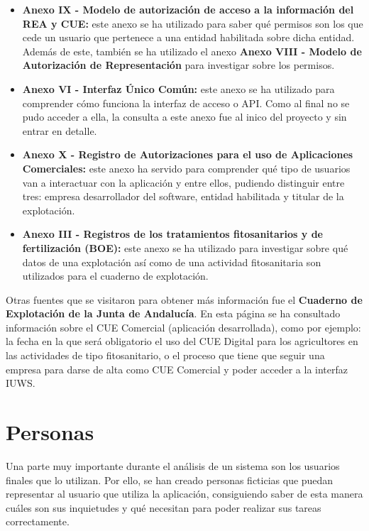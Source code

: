 \begin{itemize}
    \item \textbf{Anexo IX - Modelo de autorización de acceso a la información del REA y CUE:} este anexo se ha utilizado para saber qué permisos son
    los que cede un usuario que pertenece a una entidad habilitada sobre dicha entidad. Además de este, también se ha utilizado el anexo \textbf{Anexo VIII - 
    Modelo de Autorización de Representación} para investigar sobre los permisos.

    \item \textbf{Anexo VI - Interfaz Único Común:} este anexo se ha utilizado para comprender cómo funciona la interfaz de acceso o API. Como al final no 
    se pudo acceder a ella, la consulta a este anexo fue al inico del proyecto y sin entrar en detalle.

    \item \textbf{Anexo X - Registro de Autorizaciones para el uso de Aplicaciones Comerciales:} este anexo ha servido para comprender qué tipo de usuarios 
    van a interactuar con la aplicación y entre ellos, pudiendo distinguir entre tres: empresa desarrollador del software, entidad habilitada y titular de la
    explotación.

    \item \textbf{Anexo III - Registros de los tratamientos fitosanitarios y de fertilización (BOE):} este anexo se ha utilizado para investigar sobre qué datos de una
    explotación así como de una actividad fitosanitaria son utilizados para el cuaderno de explotación.
\end{itemize}

Otras fuentes que se visitaron para obtener más información fue el \textbf{Cuaderno de Explotación de la Junta de Andalucía}. En esta página se ha consultado 
información sobre el CUE Comercial (aplicación desarrollada), como por ejemplo: la fecha en la que será obligatorio el uso del CUE Digital para los agricultores 
en las actividades de tipo fitosanitario, o el proceso que tiene que seguir una empresa para darse de alta como CUE Comercial y poder acceder a la interfaz IUWS.

\section{Personas}

Una parte muy importante durante el análisis de un sistema son los usuarios finales que lo utilizan. Por ello, se han creado
personas ficticias que puedan representar al usuario que utiliza la aplicación, consiguiendo saber de esta manera cuáles son 
sus inquietudes y qué necesitan para poder realizar sus tareas correctamente.

